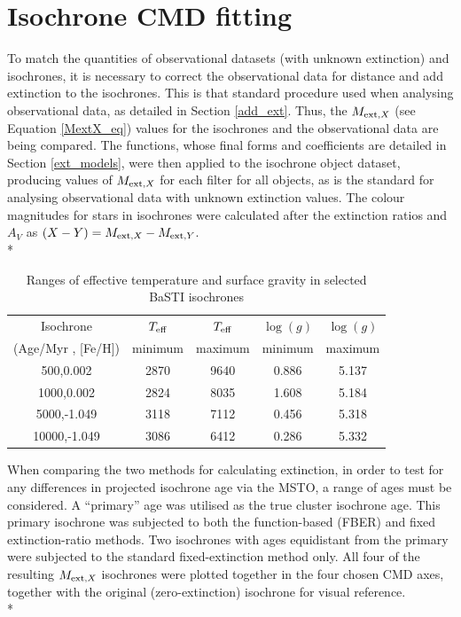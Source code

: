 \documentclass[12pt, a4paper]{report}
\begin{document}
\section{Isochrone CMD fitting} \label{isoc_fit} 

To match the quantities of observational datasets (with unknown extinction) and isochrones, it is necessary to correct the observational data for distance and add extinction to the isochrones. This is that standard procedure used when analysing observational data, as detailed in Section \ref{add_ext}. Thus, the $M_{\textnormal{ext},X}$ (see Equation \ref{MextX_eq}) values for the isochrones and the observational data are being compared. The functions, whose final forms and coefficients are detailed in Section \ref{ext_models}, were then applied to the isochrone object dataset, producing values of $M_{\textnormal{ext},X}$ for each filter for all objects, as is the standard for analysing observational data with unknown extinction values. The colour magnitudes for stars in isochrones were calculated after the extinction ratios and $A_{V}$ as $(X-Y) = M_{\textnormal{ext},X} - M_{\textnormal{ext},Y}$.\\*

\begin{table}
\begin{center}
\begin{tabular}{ccccc}
\hline
Isochrone & $T_{\textnormal{eff}}$ & $T_{\textnormal{eff}}$ & $\log(g)$ & $\log(g)$ \\
(Age/Myr , [Fe/H]) & minimum & maximum & minimum & maximum \\
\hline
500,0.002 & 2870 & 9640 & 0.886 & 5.137 \\
1000,0.002 & 2824 & 8035 & 1.608 & 5.184 \\
5000,-1.049 & 3118 & 7112 & 0.456 & 5.318 \\
10000,-1.049 & 3086 & 6412 & 0.286 & 5.332 \\
\hline
\end{tabular}
\caption{Ranges of effective temperature and surface gravity in selected BaSTI isochrones}
\label{variable_ranges}
\end{center}
\end{table}

When comparing the two methods for calculating extinction, in order to test for any differences in projected isochrone age via the MSTO, a range of ages must be considered. A ``primary'' age was utilised as the true cluster isochrone age. This primary isochrone was subjected to both the function-based (FBER) and fixed extinction-ratio methods. Two isochrones with ages equidistant from the primary were subjected to the standard fixed-extinction method only. All four of the resulting $M_{\textnormal{ext},X}$ isochrones were plotted together in the four chosen CMD axes, together with the original (zero-extinction) isochrone for visual reference.\\*
\end{document}
